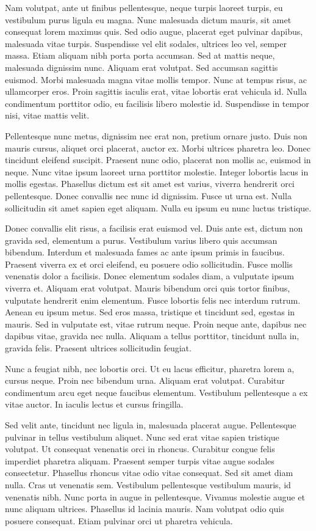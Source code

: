 \documentclass{homework}
\begin{document}
Nam volutpat, ante ut finibus pellentesque, neque turpis laoreet turpis, eu vestibulum purus ligula eu magna. Nunc malesuada dictum mauris, sit amet consequat lorem maximus quis. Sed odio augue, placerat eget pulvinar dapibus, malesuada vitae turpis. Suspendisse vel elit sodales, ultrices leo vel, semper massa. Etiam aliquam nibh porta porta accumsan. Sed at mattis neque, malesuada dignissim nunc. Aliquam erat volutpat. Sed accumsan sagittis euismod. Morbi malesuada magna vitae mollis tempor. Nunc at tempus risus, ac ullamcorper eros. Proin sagittis iaculis erat, vitae lobortis erat vehicula id. Nulla condimentum porttitor odio, eu facilisis libero molestie id. Suspendisse in tempor nisi, vitae mattis velit.

Pellentesque nunc metus, dignissim nec erat non, pretium ornare justo. Duis non mauris cursus, aliquet orci placerat, auctor ex. Morbi ultrices pharetra leo. Donec tincidunt eleifend suscipit. Praesent nunc odio, placerat non mollis ac, euismod in neque. Nunc vitae ipsum laoreet urna porttitor molestie. Integer lobortis lacus in mollis egestas. Phasellus dictum est sit amet est varius, viverra hendrerit orci pellentesque. Donec convallis nec nunc id dignissim. Fusce ut urna est. Nulla sollicitudin sit amet sapien eget aliquam. Nulla eu ipsum eu nunc luctus tristique.

Donec convallis elit risus, a facilisis erat euismod vel. Duis ante est, dictum non gravida sed, elementum a purus. Vestibulum varius libero quis accumsan bibendum. Interdum et malesuada fames ac ante ipsum primis in faucibus. Praesent viverra ex et orci eleifend, eu posuere odio sollicitudin. Fusce mollis venenatis dolor a facilisis. Donec elementum sodales diam, a vulputate ipsum viverra et. Aliquam erat volutpat. Mauris bibendum orci quis tortor finibus, vulputate hendrerit enim elementum. Fusce lobortis felis nec interdum rutrum. Aenean eu ipsum metus. Sed eros massa, tristique et tincidunt sed, egestas in mauris. Sed in vulputate est, vitae rutrum neque. Proin neque ante, dapibus nec dapibus vitae, gravida nec nulla. Aliquam a tellus porttitor, tincidunt nulla in, gravida felis. Praesent ultrices sollicitudin feugiat.

Nunc a feugiat nibh, nec lobortis orci. Ut eu lacus efficitur, pharetra lorem a, cursus neque. Proin nec bibendum urna. Aliquam erat volutpat. Curabitur condimentum arcu eget neque faucibus elementum. Vestibulum pellentesque a ex vitae auctor. In iaculis lectus et cursus fringilla.

Sed velit ante, tincidunt nec ligula in, malesuada placerat augue. Pellentesque pulvinar in tellus vestibulum aliquet. Nunc sed erat vitae sapien tristique volutpat. Ut consequat venenatis orci in rhoncus. Curabitur congue felis imperdiet pharetra aliquam. Praesent semper turpis vitae augue sodales consectetur. Phasellus rhoncus vitae odio vitae consequat. Sed sit amet diam nulla. Cras ut venenatis sem. Vestibulum pellentesque vestibulum mauris, id venenatis nibh. Nunc porta in augue in pellentesque. Vivamus molestie augue et nunc aliquam ultrices. Phasellus id lacinia mauris. Nam volutpat odio quis posuere consequat. Etiam pulvinar orci ut pharetra vehicula.
\end{document}
